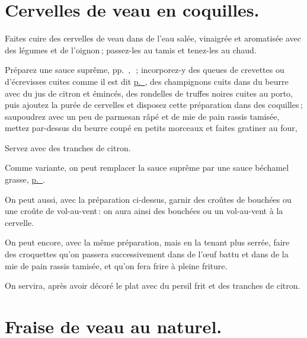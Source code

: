 \section*{\centering Cervelles de veau en coquilles.}
{}

Faites cuire des cervelles de veau dans de l'eau salée, vinaigrée et aromatisée
avec des légumes et de l'oignon ; passez-les au tamis et tenez-les au chaud.

Préparez une sauce suprême,
pp. \hyperlink{p0419}{\pageref{pg0419}}, \hyperlink{p0510}{\pageref{pg0510}} ; incorporez-y
des queues de crevettes ou d'écrevisses cuites comme il est dit
\hyperlink{p0287}{p. \pageref{pg0287}}, des champignons cuits dans du beurre avec
du jus de citron et émincés, des rondelles de truffes noires cuites au porto,
puis ajoutez la purée de cervelles et disposez cette préparation dans des
coquilles ; saupoudrez avec un peu de parmesan râpé et de mie de pain rassis
tamisée, mettez par-dessus du beurre coupé en petits morceaux et faites
gratiner au four,

Servez avec des tranches de citron.

\sk

Comme variante, on peut remplacer la sauce suprême par une sauce béchamel
grasse, \hyperlink{p0566}{p. \pageref{pg0566}}.

\sk

On peut aussi, avec la préparation ci-dessus, garnir des croûtes de bouchées ou
une croûte de vol-au-vent : on aura ainsi des bouchées ou un vol-au-vent à la
cervelle.

\sk

On peut encore, avec la même préparation, mais en la tenant plus serrée, faire
des croquettes qu'on passera successivement dans de l'œuf battu et dans de la
mie de pain rassis tamisée, et qu'on fera frire à pleine friture.

On servira, après avoir décoré le plat avec du persil frit et des tranches de
citron.

\section*{\centering Fraise de veau au naturel.}
{}
\label{pg0425} \hypertarget{p0425}{}

